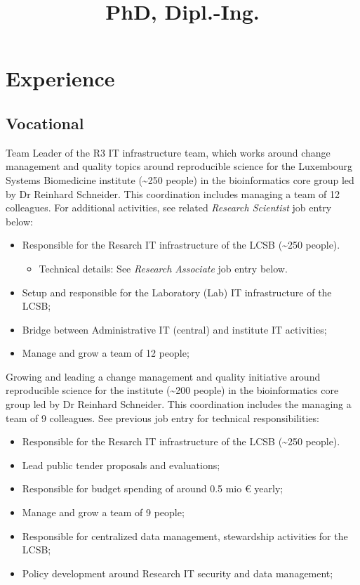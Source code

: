 \documentclass[11pt,a4paper,nolmodern,sans]{moderncv}        %
\title{PhD, Dipl.-Ing.}                               %
\begin{document}
\makecvtitle


\section{Experience}
\subsection{Vocational}

{Team Leader of the R3 IT infrastructure team, which works around change management and quality topics around reproducible science for the Luxembourg Systems Biomedicine institute (\textasciitilde 250 people) in the bioinformatics core group led by Dr Reinhard Schneider. This coordination includes managing a team of 12 colleagues. \newline{} For additional activities, see related \textit{Research Scientist} job entry below:
\begin{itemize}
	\item Responsible for the Resarch IT infrastructure of the LCSB (\textasciitilde 250 people). 
	\begin{itemize}
		\item Technical details: See \textit{Research Associate} job entry below.
	\end{itemize}
	\item Setup and responsible for the Laboratory (Lab) IT infrastructure of the LCSB;
	\item Bridge between Administrative IT (central) and institute IT activities;
	\item Manage and grow a team of 12 people;
\end{itemize}} 

{Growing and leading a change management and quality initiative around reproducible science for the institute (\textasciitilde 200 people) in the bioinformatics core group led by Dr Reinhard Schneider. This coordination includes the managing a team of 9 colleagues. \newline{} See previous job entry for technical responsibilities:
\begin{itemize}
	\item Responsible for the Resarch IT infrastructure of the LCSB (\textasciitilde 250 people). 
	\item Lead public tender proposals and evaluations;
	\item Responsible for budget spending of around 0.5 mio € yearly;
	\item Manage and grow a team of 9 people;
	\item Responsible for centralized data management, stewardship activities for the LCSB;
	\item Policy development around Research IT security and data management;
\end{itemize}}
\end{document}
